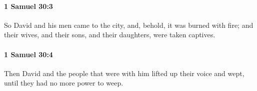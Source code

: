 		\paragraph{1 Samuel 30:3} %
			\label{1SAMUEL-30-3}

			So David and his men came to the city, and, behold, it was burned with fire; and their wives, and their sons, and their daughters, were taken captives.


		\paragraph{1 Samuel 30:4} %
			\label{1SAMUEL-30-4}

			Then David and the people that were with him lifted up their voice and wept, until they had no more power to weep.


